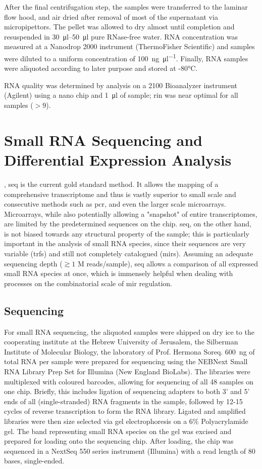 After the final centrifugation step, the samples were transferred to the laminar flow hood, and air dried after removal of most of the supernatant via micropipettors. The pellet was allowed to dry almost until completion and resuspended in \SIrange{30}{50}{\micro\litre} pure RNase-free water. RNA concentration was measured at a Nanodrop 2000 instrument (ThermoFisher Scientific) and samples were diluted to a uniform concentration of \SI{100}{\nano\gram\per\micro\litre}. Finally, RNA samples were aliquoted according to later purpose and stored at -80°C.

RNA quality was determined by analysis on a 2100 Bioanalyzer instrument (Agilent) using a nano chip and \SI{1}{\micro\litre} of sample; \ac{rin} was near optimal for all samples ($> 9$).

\section{Small RNA Sequencing and Differential Expression Analysis}
, \ac{seq} is the current gold standard method. It allows the mapping of a comprehensive transcriptome and thus is vastly superior to small scale and consecutive methods such as \ac{pcr}, and even the larger scale microarrays. Microarrays, while also potentially allowing a "snapshot" of entire transcriptomes, are limited by the predetermined sequences on the chip. \ac{seq}, on the other hand, is not biased towards any structural property of the sample; this is particularly important in the analysis of small RNA species, since their sequences are very variable (\acp{trf}) and still not completely catalogued (\acp{mir}). Assuming an adequate sequencing depth ($\gtrsim 1$ M reads/sample), \ac{seq} allows a comparison of all expressed small RNA species at once, which is immensely helpful when dealing with processes on the combinatorial scale of \ac{mir} regulation.

\subsection{Sequencing}
For small RNA sequencing, the aliquoted samples were shipped on dry ice to the cooperating institute at the Hebrew University of Jerusalem, the Silberman Institute of Molecular Biology, the laboratory of Prof. Hermona Soreq. \SI{600}{\nano\gram} of total RNA per sample were prepared for sequencing using the NEBNext Small RNA Library Prep Set for Illumina (New England BioLabs). The libraries were multiplexed with coloured barcodes, allowing for sequencing of all 48 samples on one chip. Briefly, this includes ligation of sequencing adapters to both 3' and 5' ends of all (single-stranded) RNA fragments in the sample, followed by 12-15 cycles of reverse transcription to form the RNA library. Ligated and amplified libraries were then size selected via gel electrophoresis on a 6\% Polyacrylamide gel. The band representing small RNA species on the gel was excised and prepared for loading onto the sequencing chip. After loading, the chip was sequenced in a NextSeq 550 series instrument (Illumina) with a read length of 80 bases, single-ended.

